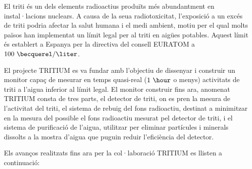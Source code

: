 El triti és un dels elements radioactius produïts més abundantment en instal·lacions nuclears. A causa de la seua radiotoxicitat, l'exposició a un excés de triti podria afectar la salut humana i el medi ambient, motiu per el qual molts països han implementat un límit legal per al triti en aigües potables. Aquest límit és establert a Espanya per la directiva del consell EURATOM \cite{100BqL} a $100~\becquerel/\liter$.

El projecte TRITIUM es va fundar amb l'objectiu de dissenyar i construir un monitor capaç de mesurar en temps quasi-real ($1~\hour$ o menys) activitats de triti a l'aigua inferior al límit legal. El monitor construir fins ara, anomenat TRITIUM consta de tres parts, el detector de triti, on es pren la mesura de l'activitat del triti, el sistema de rebuig del fons radioactiu, destinat a minimitzar en la mesura del possible el fons radioactiu mesurat pel detector de triti, i el sistema de purificació de l'aigua, utilitzar per eliminar partícules i minerals dissolts a la mostra d'aigua que puguin reduir l'eficiència del detector.

Els avanços realitzats fins ara per la col·laboració TRITIUM es llisten a continuació:

